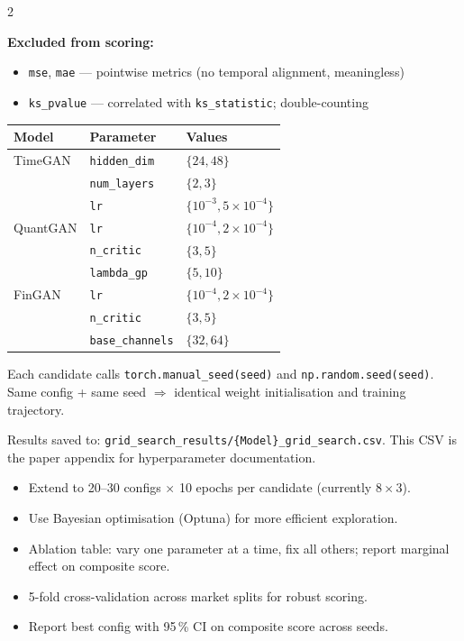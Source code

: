 \documentclass[10pt]{article}
\newcommand{\navybox}[2]{\begin{tcolorbox}[mybox={Navy}{LBg},title={#1}]#2\end{tcolorbox}}
\newcommand{\greenbox}[2]{\begin{tcolorbox}[mybox={FGreen}{GBg},title={#1}]#2\end{tcolorbox}}
\newcommand{\amberbox}[2]{\begin{tcolorbox}[mybox={Amber}{ABg},title={#1}]#2\end{tcolorbox}}
\begin{document}
\begin{multicols}{2}
{\textbf{Excluded from scoring:}
\begin{itemize}
  \item \texttt{mse}, \texttt{mae} --- pointwise metrics (no temporal alignment, meaningless)
  \item \texttt{ks\_pvalue} --- correlated with \texttt{ks\_statistic}; double-counting
\end{itemize}}

\columnbreak

\navybox{Search Space (8 candidates $= 2^3$ per model)}{%
\begin{center}
\small\renewcommand{\arraystretch}{1.3}
\begin{tabular}{@{}lll@{}}
\toprule
\textbf{Model} & \textbf{Parameter} & \textbf{Values} \\
\midrule
\textcolor{TGcol}{TimeGAN}  & \texttt{hidden\_dim} & $\{24, 48\}$ \\
                             & \texttt{num\_layers}  & $\{2, 3\}$ \\
                             & \texttt{lr}           & $\{10^{-3}, 5\!\times\!10^{-4}\}$ \\[4pt]
\textcolor{QGcol}{QuantGAN} & \texttt{lr}           & $\{10^{-4}, 2\!\times\!10^{-4}\}$ \\
                             & \texttt{n\_critic}    & $\{3, 5\}$ \\
                             & \texttt{lambda\_gp}   & $\{5, 10\}$ \\[4pt]
\textcolor{FGcol}{FinGAN}   & \texttt{lr}           & $\{10^{-4}, 2\!\times\!10^{-4}\}$ \\
                             & \texttt{n\_critic}    & $\{3, 5\}$ \\
                             & \texttt{base\_channels}& $\{32, 64\}$ \\
\bottomrule
\end{tabular}
\end{center}}

\greenbox{Reproducibility}{%
Each candidate calls \texttt{torch.manual\_seed(seed)} and \texttt{np.random.seed(seed)}.
Same config + same seed $\Rightarrow$ identical weight initialisation and training trajectory.

Results saved to: \texttt{grid\_search\_results/\{Model\}\_grid\_search.csv}. This CSV is the paper appendix for hyperparameter documentation.}

\amberbox{Recommended Extensions for Publication}{%
\begin{itemize}
  \item Extend to 20--30 configs $\times$ 10 epochs per candidate (currently 8\,$\times$\,3).
  \item Use Bayesian optimisation (Optuna) for more efficient exploration.
  \item Ablation table: vary one parameter at a time, fix all others; report marginal effect on composite score.
  \item 5-fold cross-validation across market splits for robust scoring.
  \item Report best config with 95\,\% CI on composite score across seeds.
\end{itemize}}


\end{multicols}
\end{document}
